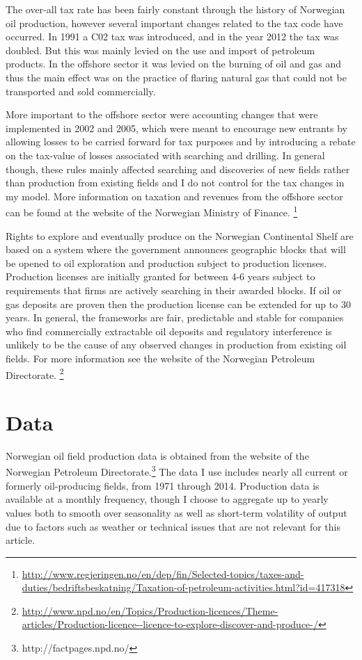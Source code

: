 \documentclass[12pt]{article}
\begin{document}
The over-all tax rate has been fairly constant through the history of Norwegian oil production, however several important changes related to the tax code have occurred.  In 1991 a C02 tax was introduced, and in the year 2012 the tax was doubled.  But this was mainly levied on the use and import of petroleum products.  In the offshore sector it was levied on the burning of oil and gas and thus the main effect was on the practice of flaring natural gas that could not be transported and sold commercially.

More important to the offshore sector were accounting changes that were implemented in 2002 and 2005, which were meant to encourage new entrants by allowing losses to be carried forward for tax purposes and by introducing a rebate on the tax-value of losses associated with searching and drilling.  In general though, these rules mainly affected searching and discoveries of new fields rather than production from existing fields and I do not control for the tax changes in my model.  More information on taxation and revenues from the offshore sector can be found at the website of the Norwegian Ministry of Finance. \footnote{\url{http://www.regjeringen.no/en/dep/fin/Selected-topics/taxes-and-duties/bedriftsbeskatning/Taxation-of-petroleum-activities.html?id=417318}}

Rights to explore and eventually produce on the Norwegian Continental Shelf are based on a system where the government announces geographic blocks that will be opened to oil exploration and production subject to production licenses.  Production licenses are initially granted for between 4-6 years subject to requirements that firms are actively searching in their awarded blocks.  If oil or gas deposits are proven then the production license can be extended for up to 30 years.  In general, the frameworks are fair, predictable and stable for companies who find commercially extractable oil deposits and regulatory interference is unlikely to be the cause of any observed changes in production from existing oil fields.  For more information see the website of the Norwegian Petroleum Directorate. \footnote{\url{http://www.npd.no/en/Topics/Production-licences/Theme-articles/Production-licence--licence-to-explore-discover-and-produce-/}}

\section{Data}
Norwegian oil field production data is obtained from the website of the Norwegian Petroleum Directorate.\footnote{http://factpages.npd.no/} The data I use includes nearly all current or formerly oil-producing fields, from 1971 through 2014. Production data is available at a monthly frequency, though I choose to aggregate up to yearly values both to smooth over seasonality as well as short-term volatility of output due to factors such as weather or technical issues that are not relevant for this article. 
\end{document}
